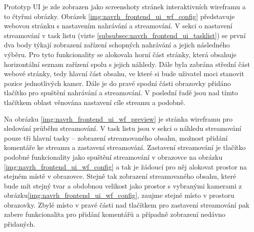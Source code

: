 \documentclass[thesis=M,czech]{FITthesis}[2012/06/26]
\begin{document}
	Prototyp UI je zde zobrazen jako screenshoty stránek interaktivních wireframu a to čtyřmi obrázky. Obrázek \ref{img:navrh_frontend_ui_wf_config} představuje webovou stránku s nastavením nahrávání a streamování. V sekci o nastavení streamování v task listu (vizte \ref{subsubsec:navrh_frontend_ui_tasklist}) se první dva body týkají zobrazení zařízení schopných nahrávání a jejich následného výběru. Pro tyto funkcionality se alokovala horní část stránky, která obsahuje horizontální seznam zařízení spolu s jejich náhledy. Dále byla zabrána střední část webové stránky, tedy hlavní část obsahu, ve které si bude uživatel moci stanovit pozice jednotlivých kamer. Dále je do pravé spodní části obrazovky přidáno tlačítko pro spuštění nahrávání a streamování. V poslední řadě jsou nad tímto tlačítkem oblast věnována nastavení cíle streamu a podobně.

Na obrázku \ref{img:navrh_frontend_ui_wf_preview} je stránka wireframu pro sledování průběhu streamování. V task listu jsou v sekci o náhledu streamování pouze tři hlavní tasky -- zobrazení streamovaného obsahu, možnost přidání komentáře ke streamu a zastavení streamování. Zastavení streamování je tlačítko podobné funkcionality jako spuštění streamování v obrazovce na obrázku  \ref{img:navrh_frontend_ui_wf_config} a tak je žádoucí pro něj alokovat prostor na stejném místě v obrazovce. Stejně tak zobrazení streamovaného obsahu, které bude mít stejný tvar a obdobnou velikost jako prostor s vybranými kamerami z obrázku\ref{img:navrh_frontend_ui_wf_config}, zaujme stejné místo v prostoru obrazovky. Zbylé místo v pravé části nad tlačítkem pro zastavení streamování pak zabere funkcionalita pro přidání komentářů a případně zobrazení nedávno přidaných. 
\end{document}
